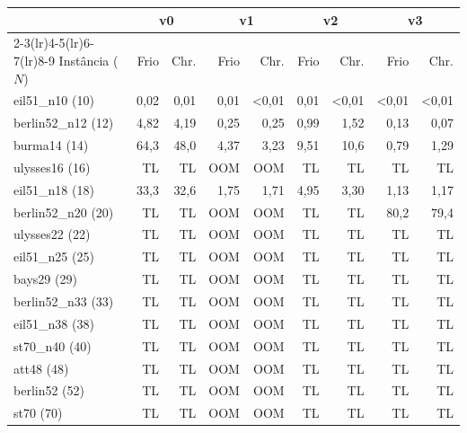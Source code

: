 \begin{tabular}{lrrrrrrrr}
\toprule
 & \multicolumn{2}{c}{v0} & \multicolumn{2}{c}{v1} & \multicolumn{2}{c}{v2} & \multicolumn{2}{c}{v3} \\
\cmidrule(lr){2-3}\cmidrule(lr){4-5}\cmidrule(lr){6-7}\cmidrule(lr){8-9}
Instância ($N$) & Frio & Chr. & Frio & Chr. & Frio & Chr. & Frio & Chr. \\
\midrule
eil51\_n10 (10) & 0,02 & 0,01 & 0,01 & <0,01 & 0,01 & <0,01 & <0,01 & <0,01 \\
berlin52\_n12 (12) & 4,82 & 4,19 & 0,25 & 0,25 & 0,99 & 1,52 & 0,13 & 0,07 \\
burma14 (14) & 64,3 & 48,0 & 4,37 & 3,23 & 9,51 & 10,6 & 0,79 & 1,29 \\
ulysses16 (16) & TL & TL & OOM & OOM & TL & TL & TL & TL \\
eil51\_n18 (18) & 33,3 & 32,6 & 1,75 & 1,71 & 4,95 & 3,30 & 1,13 & 1,17 \\
berlin52\_n20 (20) & TL & TL & OOM & OOM & TL & TL & 80,2 & 79,4 \\
ulysses22 (22) & TL & TL & OOM & OOM & TL & TL & TL & TL \\
eil51\_n25 (25) & TL & TL & OOM & OOM & TL & TL & TL & TL \\
bays29 (29) & TL & TL & OOM & OOM & TL & TL & TL & TL \\
berlin52\_n33 (33) & TL & TL & OOM & OOM & TL & TL & TL & TL \\
eil51\_n38 (38) & TL & TL & OOM & OOM & TL & TL & TL & TL \\
st70\_n40 (40) & TL & TL & OOM & OOM & TL & TL & TL & TL \\
att48 (48) & TL & TL & OOM & OOM & TL & TL & TL & TL \\
berlin52 (52) & TL & TL & OOM & OOM & TL & TL & TL & TL \\
st70 (70) & TL & TL & OOM & OOM & TL & TL & TL & TL \\
\bottomrule
\end{tabular}
